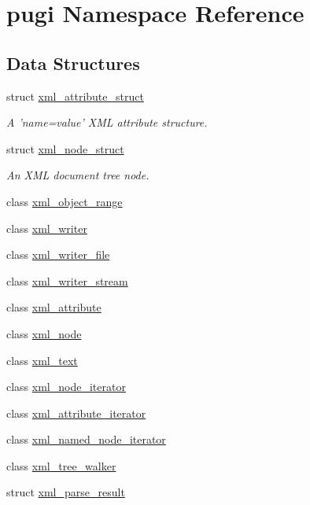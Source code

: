 \hypertarget{namespacepugi}{\section{pugi Namespace Reference}
\label{namespacepugi}
}
\subsection*{Data Structures}
\begin{DoxyCompactItemize}
\item 
struct \hyperlink{structpugi_1_1xml__attribute__struct}{xml\-\_\-attribute\-\_\-struct}
\begin{DoxyCompactList}\small\item\em A 'name=value' X\-M\-L attribute structure. \end{DoxyCompactList}\item 
struct \hyperlink{structpugi_1_1xml__node__struct}{xml\-\_\-node\-\_\-struct}
\begin{DoxyCompactList}\small\item\em An X\-M\-L document tree node. \end{DoxyCompactList}\item 
class \hyperlink{classpugi_1_1xml__object__range}{xml\-\_\-object\-\_\-range}
\item 
class \hyperlink{classpugi_1_1xml__writer}{xml\-\_\-writer}
\item 
class \hyperlink{classpugi_1_1xml__writer__file}{xml\-\_\-writer\-\_\-file}
\item 
class \hyperlink{classpugi_1_1xml__writer__stream}{xml\-\_\-writer\-\_\-stream}
\item 
class \hyperlink{classpugi_1_1xml__attribute}{xml\-\_\-attribute}
\item 
class \hyperlink{classpugi_1_1xml__node}{xml\-\_\-node}
\item 
class \hyperlink{classpugi_1_1xml__text}{xml\-\_\-text}
\item 
class \hyperlink{classpugi_1_1xml__node__iterator}{xml\-\_\-node\-\_\-iterator}
\item 
class \hyperlink{classpugi_1_1xml__attribute__iterator}{xml\-\_\-attribute\-\_\-iterator}
\item 
class \hyperlink{classpugi_1_1xml__named__node__iterator}{xml\-\_\-named\-\_\-node\-\_\-iterator}
\item 
class \hyperlink{classpugi_1_1xml__tree__walker}{xml\-\_\-tree\-\_\-walker}
\item 
struct \hyperlink{structpugi_1_1xml__parse__result}{xml\-\_\-parse\-\_\-result}

\end{DoxyCompactItemize}
